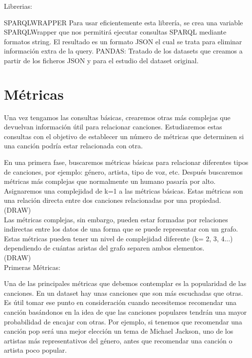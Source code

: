 Librerias:

SPARQLWRAPPER
Para usar eficientemente esta librería, se crea una variable SPARQLWrapper que nos permitirá ejecutar consultas SPARQL mediante formatos string.
El resultado es un formato JSON el cual se trata para eliminar información extra de la query.
PANDAS:
Tratado de los datasets que creamos a partir de los ficheros JSON y para el estudio del dataset original.

\section{Métricas}

Una vez tengamos las consultas básicas, crearemos otras más complejas que devuelvan información útil para relacionar canciones. Estudiaremos estas consultas con el objetivo de establecer un número de métricas que determinen si una canción podría estar relacionada con otra.

En una primera fase, buscaremos métricas básicas para relacionar diferentes tipos de canciones, por ejemplo: género, artista, tipo de voz, etc. Después buscaremos métricas más complejas que normalmente un humano pasaría por alto. Asignaremos una complejidad de k=1 a las métricas básicas. Estas métricas son una relación directa entre dos canciones relacionadas por una propiedad.\\

(DRAW)\\

Las métricas complejas, sin embargo, pueden estar formadas por relaciones indirectas entre los datos de una forma que se puede representar con un grafo. Estas métricas pueden tener un nivel de complejidad diferente (k= 2, 3, 4...) dependiendo de cuántas aristas del grafo separen ambos elementos.\\

(DRAW)\\


Primeras Métricas:

Una de las principales métricas que debemos contemplar es la popularidad de las canciones. En un dataset hay unas canciones que son más escuchadas que otras. Es útil tomar ese punto en consideración cuando necesitemos recomendar una canción basándonos en la idea de que las canciones populares tendrán una mayor probabilidad de encajar con otras. Por ejemplo, si tenemos que recomendar una canción pop será una mejor elección un tema de Michael Jackson, uno de los artistas más representativos del género, antes que recomendar una canción o artista poco popular.

